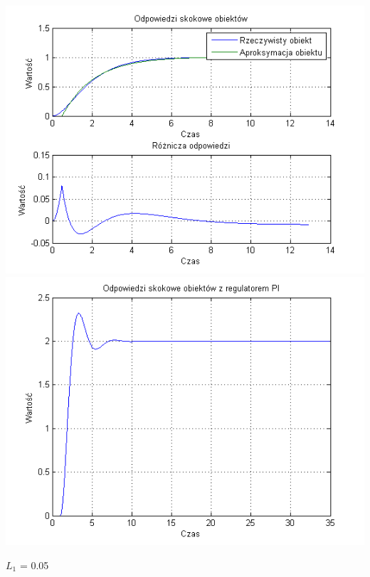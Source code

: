 \documentclass[10pt,a4paper]{article}
\begin{document}
\begin{center}
\includegraphics[scale=1]{images/jeden/skrypt_155.png}\\
\includegraphics[scale=1]{images/jeden/skrypt_156.png}\\
\end{center}
\newpage
$L_1$ = 0.05
\end{document}
